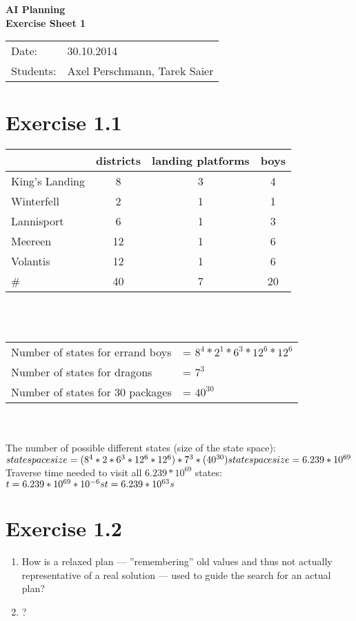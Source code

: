 \documentclass[11pt,a4paper]{article}
\begin{document}
\begin{center}
\Huge{\textbf{AI Planning}}\\
\LARGE{\textbf{Exercise Sheet 1}}
\end{center}
\vspace{2cm}
\begin{tabular}{ll}
Date: & 30.10.2014\\
Students: & Axel Perschmann, Tarek Saier
\end{tabular}

\section*{Exercise 1.1}
\begin{tabular}{ l | c c c }
     & districts & landing platforms & boys \\
  \hline
  King's Landing &  8 & 3 & 4\\
  Winterfell &  2 & 1 & 1\\
  Lannisport &  6 & 1 & 3\\
  Meereen & 12 & 1 & 6\\
  Volantis & 12 & 1 & 6\\
  \hline
  \#  & 40 & 7 & 20
\end{tabular}\\\\

\begin{tabular}{ll}
Number of states for errand boys & = $8^4 * 2^1 * 6^3 * 12^6 * 12^6$ \\
Number of states for dragons & = $7^3$ \\
Number of states for 30 packages &= $40^{30}$
\end{tabular}\\\\

The number of possible different states (size of the state space):\\
$state space size = (8^4 * 2 * 6^3 * 12^6 * 12^6)  *  7^3  * (40^{30})\\
state space size= 6.239 * 10^{69}$\\

Traverse time needed to visit all $6.239 * 10^{69}$ states:\\
$t = 6.239 * 10^{69} * 10^{-6}s\\
t = 6.239 * 10^{63}s$

\section*{Exercise 1.2}

\begin{enumerate}
\item How is a relaxed plan --- ''remembering'' old values and thus not actually representative of a real solution --- used to guide the search for an actual plan?
\item ?
\end{enumerate}
\end{document}
